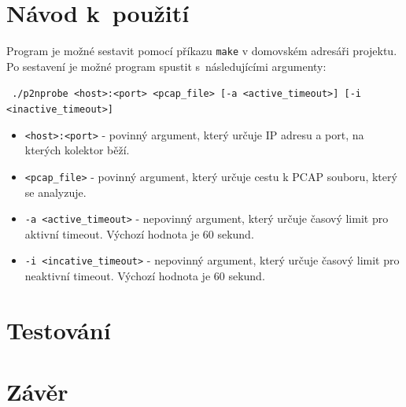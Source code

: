 \documentclass[a4paper, 11pt]{article}
\begin{document}
\begin{sloppypar}
\section{Návod k~použití}

Program je možné sestavit pomocí příkazu \texttt{make} v domovském adresáři projektu. Po sestavení je možné program spustit s~následujícími argumenty:

\texttt{
    ./p2nprobe <host>:<port> <pcap\_file> [-a <active\_timeout>] 
            [-i <inactive\_timeout>]
}

\begin{itemize}
    \item \texttt{<host>:<port>} - povinný argument, který určuje IP adresu a port, na kterých kolektor běží.
    \item \texttt{<pcap\_file>} - povinný argument, který určuje cestu k PCAP souboru, který se analyzuje.
    \item \texttt{-a <active\_timeout>} - nepovinný argument, který určuje časový limit pro aktivní timeout. Výchozí hodnota je 60 sekund.
    \item \texttt{-i <incative\_timeout>} - nepovinný argument, který určuje časový limit pro neaktivní timeout. Výchozí hodnota je 60 sekund.
\end{itemize}

\section{Testování}
\section{Závěr}



\end{sloppypar}
\end{document}
